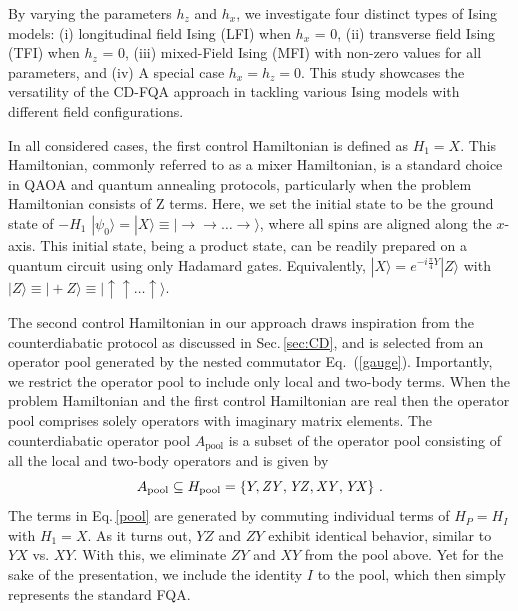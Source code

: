 \documentclass[twocolumn,aps,superscriptaddress,floatfix,longbibliography]{revtex4-2}
\newcommand{\awc}[1]{{\color[rgb]{.8,.6,.6}{[AW: {\it #1}\,]}}}
\newcommand{\hir}[1]{{\color[rgb]{0.4,0.1,0.6}{#1}}}
\newcommand{\Sec}[1]{Sec.\,\ref{#1}}
\newcommand{\Eq}[1]{Eq.\,\eqref{#1}}
\def\YX{\ensuremath{\mathit{YX}}\xspace} %
\def\XY{\ensuremath{\mathit{XY}}\xspace}
\def\YZ{\ensuremath{\mathit{YZ}}\xspace}
\def\ZY{\ensuremath{\mathit{ZY}}\xspace}
\begin{document}
By varying the parameters
$h_z$ and $h_x$,
we investigate four distinct types of Ising models:
(i)   longitudinal field Ising (LFI) when $h_x$ = 0,
(ii)  transverse field Ising (TFI) when $h_z$ = 0,
(iii) mixed-Field Ising (MFI) with non-zero values for all %
parameters, and
(iv)  A special case $h_x=h_z=0$. %
This study showcases the versatility of the CD-FQA approach in
tackling various Ising models with different field
configurations. 

In all considered cases, the first control Hamiltonian is
defined as $H_1=X$. This Hamiltonian, commonly referred to as a
mixer Hamiltonian, is a standard choice in QAOA and quantum
annealing protocols, particularly when the problem Hamiltonian
consists of Z %
terms. Here, we set the initial state
to be the ground state of $-H_1$ %
$|\psi_{0}\rangle = |X\rangle \equiv
|\rightarrow\rightarrow \ldots \rightarrow\rangle$,
where all spins
are aligned along the $x$-axis. This initial state, being a
product state, can be readily prepared on a quantum circuit
using only Hadamard gates. Equivalently,
$|X\rangle = e^{-i\frac{\pi}{4} Y} |Z\rangle$
with $|Z\rangle \equiv |{+}Z\rangle
\equiv |\uparrow \uparrow \ldots \uparrow \rangle$.

The second control Hamiltonian in our approach draws inspiration
from the counterdiabatic protocol as discussed in 
\Sec{sec:CD}, %
and is selected from an operator pool generated by the nested
commutator Eq.~(\ref{gauge}). Importantly, we restrict
the operator pool to include only local and two-body terms. When
the problem Hamiltonian and the first control Hamiltonian are
real then the operator pool comprises solely operators with imaginary matrix elements.
The counterdiabatic operator pool $A_{\text{pool}}$
is a subset of the operator pool consisting of all the local and
two-body operators and is given by
\begin{equation}
   A_{\rm pool}\subseteq 
   H_{\rm pool} = \{Y, \ZY, \YZ, \XY, \YX \}
\text{ .}\label{pool}
\end{equation}
The terms in \Eq{pool} are generated by commuting individual
terms of $H_P = H_I$ with $H_1=X$. As it turns out, %
\YZ and \ZY exhibit identical behavior,
similar to \YX vs. \XY. %
With this, we eliminate \ZY and \XY from the pool above.
Yet for the sake of the presentation, we include the
identity $I$ to the pool, which then simply represents
the standard FQA.
\end{document}
